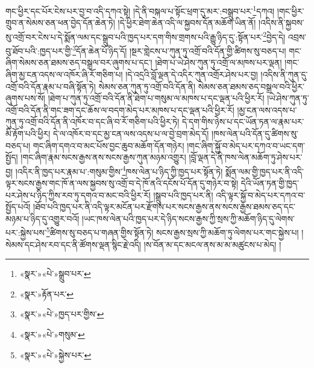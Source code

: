 གང་ཕྱིར་དང་པོར་ངེས་པར་བྱ་བ་འདི་དཀའ་སྟེ། །དེ་ནི་བསྐལ་པ་སྟོང་ཕྲག་དུ་མར་:བསྒྲུབ་པར་\footnote{«སྣར་»«པེ་»སྒྲུབ་པར་}དཀའ། །གང་ཕྱིར་གྲུབ་ན་སེམས་ཅན་ཕན་བྱེད་དོན་ཆེན་ཏེ། །དེ་ཕྱིར་ཐེག་ཆེན་འདི་ལ་སྐྱབས་དོན་མཆོག་ཡིན་ནོ། །འདིས་ནི་སྐྱབས་སུ་འགྲོ་བར་ངེས་པ་དེ་སྨོན་ལམ་དང་སྒྲུབ་པའི་ཁྱད་པར་དག་གིས་གྲགས་པའི་རྒྱུ་ཉིད་དུ་:སྟོན་པར་\footnote{«སྣར་»རྟོན་པར་}བྱེད་དེ། འབྲས་བུ་ཐོབ་པའི་:ཁྱད་པར་གྱི་\footnote{«སྣར་»«པེ་»ཁྱད་པར་གྱིས་}དོན་ཆེན་པོ་ཉིད་དོ། །སྔར་གླེངས་པ་ཀུན་ཏུ་འགྲོ་བའི་དོན་གྱི་ཚིགས་སུ་བཅད་པ། གང་ཞིག་སེམས་ཅན་ཐམས་ཅད་བསྒྲལ་བར་ཞུགས་པ་དང་། །ཐེག་པ་ཡེ་ཤེས་ཀུན་ཏུ་འགྲོ་ལ་མཁས་པར་ལྡན། །གང་ཞིག་མྱ་ངན་འདས་ལ་འཁོར་ཞི་རོ་གཅིག་པ། །དེ་འདྲའི་བློ་ལྡན་དེ་འདིར་ཀུན་འགྲོར་ཤེས་པར་བྱ། །འདིས་ནི་ཀུན་དུ་འགྲོ་བའི་དོན་རྣམ་པ་བཞི་སྟོན་ཏེ། སེམས་ཅན་ཀུན་ཏུ་འགྲོ་བའི་དོན་ནི། སེམས་ཅན་ཐམས་ཅད་བསྒྲལ་བའི་ཕྱིར་ཞུགས་པས་སོ། །ཐེག་པ་ཀུན་ཏུ་འགྲོ་བའི་དོན་ནི་ཐེག་པ་གསུམ་ལ་མཁས་པ་དང་ལྡན་པའི་ཕྱིར་རོ། །ཡེ་ཤེས་ཀུན་ཏུ་འགྲོ་བའི་དོན་ནི་གང་ཟག་དང་ཆོས་ལ་བདག་མེད་པར་མཁས་པ་དང་ལྡན་པའི་ཕྱིར་རོ། །མྱ་ངན་ལས་འདས་པ་ཀུན་ཏུ་འགྲོ་བའི་དོན་ནི་འཁོར་བ་དང་ཞི་བ་རོ་གཅིག་པའི་ཕྱིར་ཏེ། དེ་དག་གིས་ཉེས་པ་དང་ཡོན་ཏན་ལ་རྣམ་པར་མི་རྟོག་པའི་ཕྱིར། དེ་ལ་འཁོར་བ་དང་མྱ་ངན་ལས་འདས་པ་ལ་བྱེ་བྲག་མེད་དོ། །ཁས་ལེན་པའི་དོན་དུ་ཚིགས་སུ་བཅད་པ། གང་ཞིག་དགའ་བ་མང་པོས་བྱང་ཆུབ་མཆོག་དོན་གཉེར། །གང་ཞིག་སྐྱོ་བ་མེད་པར་དཀའ་བ་ཡང་དག་སྤྱོད། །གང་ཞིག་རྣམ་སངས་རྒྱས་ནས་སངས་རྒྱས་ཀུན་མཉམ་འགྱུར། །བློ་ལྡན་དེ་ནི་ཁས་ལེན་མཆོག་ཏུ་ཤེས་པར་བྱ། །འདིར་ནི་ཁྱད་པར་རྣམ་པ་:གསུམ་གྱིས་\footnote{«སྣར་»«པེ་»གསུམ་}ཁས་ལེན་པ་ཉིད་ཀྱི་ཁྱད་པར་སྟོན་ཏེ། སྨོན་ལམ་གྱི་ཁྱད་པར་ནི་འདི་ལྟར་སངས་རྒྱས་གང་ཁོ་ན་ལས་སྐྱབས་སུ་འགྲོ་བ་དེ་ཁོ་ནའི་དངོས་པོ་དོན་དུ་གཉེར་བ་སྟེ། དེའི་ཡོན་ཏན་གྱི་ཁྱད་པར་ཤེས་པ་ཉིད་ཀྱིས་རབ་ཏུ་དགའ་བ་མང་བའི་ཕྱིར་རོ། །སྒྲུབ་པའི་ཁྱད་པར་ནི། འདི་ལྟར་སྐྱོ་བ་མེད་པར་དཀའ་བ་སྤྱོད་པའོ། །ཐོབ་པའི་ཁྱད་པར་ནི་འདི་ལྟར་མངོན་པར་རྫོགས་པར་སངས་རྒྱས་ནས་སངས་རྒྱས་ཐམས་ཅད་དང་མཉམ་པ་ཉིད་དུ་འགྱུར་བའོ། །ཡང་ཁས་ལེན་པའི་ཁྱད་པར་དེ་ཉིད་སངས་རྒྱས་ཀྱི་སྲས་ཀྱི་མཆོག་ཉིད་དུ་ལེགས་པར་:སྐྱེས་པས་\footnote{«སྣར་»«པེ་»སྐྱེས་པར་}ཚིགས་སུ་བཅད་པ་གཞན་གྱིས་སྟོན་ཏེ། སངས་རྒྱས་སྲས་ཀྱི་མཆོག་ཏུ་ལེགས་པར་གང་སྐྱེས་པ། །སེམས་དང་ཤེས་རབ་དང་ནི་ཚོགས་ལྡན་སྙིང་རྗེ་འདི། །ས་བོན་མ་དང་མངལ་ནས་མ་མ་མཚུངས་པ་མེད། །
